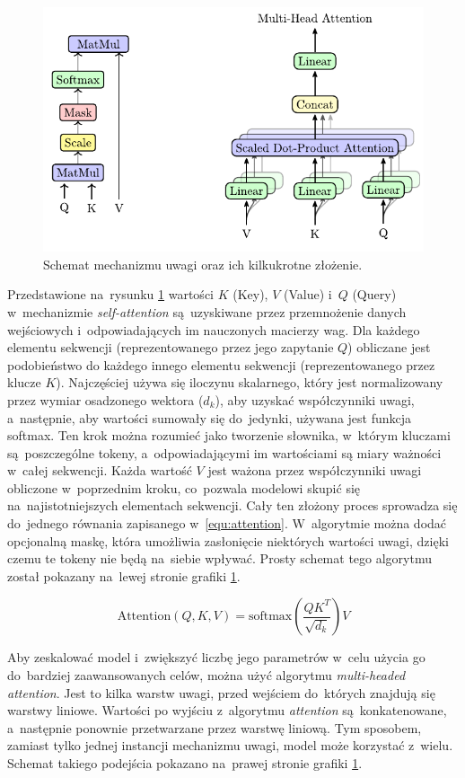 \documentclass[data-science]{agh-wi} %
\begin{document}
\begin{figure}[ht!]
    \centering
    \includegraphics[width=0.7\linewidth]{./img/attention_heads.pdf}
    \caption{Schemat mechanizmu uwagi oraz ich kilkukrotne złożenie.}\label{fig:attention_heads}
\end{figure}

Przedstawione na~rysunku \ref*{fig:attention_heads} wartości $K$ (Key), $V$ (Value) i~$Q$ (Query) w~mechanizmie \textit{self-attention} są~uzyskiwane przez przemnożenie danych wejściowych i~odpowiadających im nauczonych macierzy wag. Dla każdego elementu sekwencji (reprezentowanego przez jego zapytanie $Q$) obliczane jest podobieństwo do każdego innego elementu sekwencji (reprezentowanego przez klucze $K$). Najczęściej używa się iloczynu skalarnego, który jest normalizowany przez wymiar osadzonego wektora ($d_k$), aby uzyskać współczynniki uwagi, a~następnie, aby wartości sumowały się do~jedynki, używana jest funkcja softmax. Ten krok można rozumieć jako tworzenie słownika, w~którym kluczami są~poszczególne tokeny, a~odpowiadającymi im wartościami są miary ważności w~całej sekwencji. Każda wartość $V$ jest ważona przez współczynniki uwagi obliczone w~poprzednim kroku, co~pozwala modelowi skupić się na~najistotniejszych elementach sekwencji. Cały ten złożony proces sprowadza się do~jednego równania zapisanego w~\ref*{equ:attention}. W~algorytmie można dodać opcjonalną maskę, która umożliwia zasłonięcie niektórych wartości uwagi, dzięki czemu te tokeny nie będą na~siebie wpływać. Prosty schemat tego algorytmu został pokazany na~lewej stronie grafiki \ref*{fig:attention_heads}.

\begin{equation}
    \text{Attention}(Q, K, V) = \text{softmax}\left(\dfrac{QK^T}{\sqrt{d_k}}\right)V
    \label{equ:attention}
\end{equation}

Aby zeskalować model i~zwiększyć liczbę jego parametrów w~celu użycia go do~bardziej zaawansowanych celów, można użyć algorytmu \textit{multi-headed attention}. Jest to kilka warstw uwagi, przed wejściem do~których znajdują się warstwy liniowe. Wartości po wyjściu z~algorytmu \textit{attention} są~konkatenowane, a~następnie ponownie przetwarzane przez warstwę liniową. Tym sposobem, zamiast tylko jednej instancji mechanizmu uwagi, model może korzystać z~wielu. Schemat takiego podejścia pokazano na~prawej stronie grafiki \ref*{fig:attention_heads}.
\end{document}
